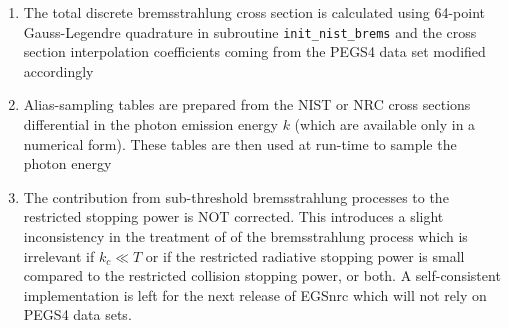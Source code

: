 \begin{enumerate}
\item
The total discrete bremsstrahlung cross section is
calculated using 64-point Gauss-Legendre quadrature in
subroutine {\tt init\_nist\_brems} and the cross section
interpolation coefficients coming from the PEGS4 data set
modified accordingly
\item
Alias-sampling tables are prepared from the NIST or NRC cross sections
differential in the photon emission energy $k$ (which are
available only in a numerical form). These tables are then
used at run-time to sample the photon energy
\item
The contribution from sub-threshold bremsstrahlung processes to
the restricted stopping power is NOT corrected. This introduces
a slight inconsistency in the treatment of of the bremsstrahlung
process which is irrelevant if $k_c \ll T$ or if
the restricted radiative stopping power is small compared to
the restricted collision stopping power, or both.
A self-consistent implementation is left for the next release
of EGSnrc which will not rely on PEGS4 data sets.
\end{enumerate}


